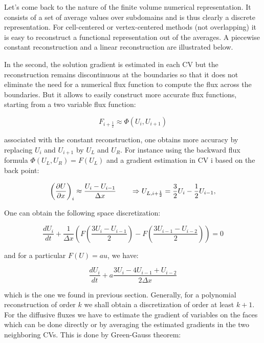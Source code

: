 Let's come back to the nature of the finite volume numerical representation. It consists of a set of average values over subdomains and is thus clearly a discrete representation. For cell-centered or vertex-centered methods (not overlapping) it is easy to reconstruct a functional representation out of the averages. A piecewise constant reconstruction and a linear reconstruction are illustrated below. 


In the second, the solution gradient is estimated in each CV but the reconstruction remains discontinuous at the boundaries so that it does not eliminate the need for a numerical flux function to compute the flux across the boundaries. But it allows to easily construct more accurate flux functions, starting from a two variable flux function: 

\begin{equation}
F_{i+\frac{1}{2}} \approx \Phi (U_i , U_{i+1})
\end{equation}

associated with the constant reconstruction, one obtains more accuracy by replacing $U_i$ and $U_{i+1}$ by $U_L$ and $U_R$. For instance using the backward flux formula $\Phi (U_L,U_R) = F(U_L)$ and a gradient estimation in CV i based on the back point:

\begin{equation}
\left(\frac{\partial U}{\partial x} \right)_i \approx \frac{U_i - U_{i-1}}{\Delta x} \qquad \Rightarrow U_{L, i+\frac{1}{2}} = \frac{3}{2} U_i -\frac{1}{2}U_{i-1},
\end{equation}

One can obtain the following space discretization: 

\begin{equation}
\frac{dU_i}{dt} + \frac{1}{\Delta x} \left( F\left(\frac{3U_i - U_{i-1}}{2} \right) - F\left(\frac{3U_{i-1} - U_{i-2}}{2} \right) \right) = 0
\end{equation}

and for a particular $F(U) = au$, we have: 

\begin{equation}
\frac{dU_i}{dt} + a \frac{3U_i - 4U_{i-1}+U_{i-2}}{2\Delta x}
\end{equation}

which is the one we found in previous section. Generally, for a polynomial reconstruction of order $k$ we shall obtain a discretization of order at least $k+1$. For the diffusive fluxes we have to estimate the gradient of variables on the faces which can be done directly or by averaging the estimated gradients in the two neighboring CVs. This is done by Green-Gauss theorem: 

